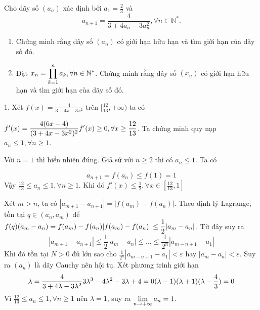 \documentclass[11pt]{scrartcl}
\begin{document}
\begin{itemize}[label=, leftmargin=0em, itemsep=0.5em]
    \begin{bt}
        Cho dãy số $\left(a_n\right)$ xác định bởi $a_1=\frac{2}{3}$ và
        $$
        a_{n+1}=\frac{4}{3+4 a_n-3 a_n^2}, \forall n \in \mathbb{N}^* .
        $$
        \begin{enumerate}
            \item Chứng minh rằng dãy số $\left(a_n\right)$ có giới hạn hữu hạn và tìm giới hạn của dãy số đó.
            \item Đặt $x_n=\displaystyle\prod_{k=1}^n a_k, \forall n \in \mathbb{N}^*$. Chứng minh rằng dây số $\left(x_n\right)$ có giới hạn hữu hạn và tìm giới hạn của dãy số đó.
        \end{enumerate}
    \end{bt}
    \begin{sol}

        1. Xét $f(x) = \frac{4}{3 + 4x - 3x^2}$ trên $[\frac{12}{13}, +\infty)$ ta có 

        $f'(x) = \frac{4(6x - 4)}{(3 + 4x - 3x^2)^2} \ra f'(x) \geq 0 ,\forall x \geq \frac{12}{13}$. Ta chứng minh quy nạp $ a_n \leq 1, \forall n \geq 1$. 
        
        Với $n = 1$ thì hiển nhiên đúng. Giả sử với $n \geq 2$ thì có $ a_n \leq 1$. Ta có 

        \[
        a_{n + 1} = f(a_n) \leq f\left(1\right) = 1
        \]
        Vậy $\frac{12}{13} \leq a_n \leq 1, \forall n \geq 1$. Khi đó $f'(x) \leq \frac{1}{2}, \forall x \in \left[\frac{12}{13},1\right]$

        Xét $m > n$, ta có $|a_{m + 1} - a_{n + 1}| = |f(a_{m}) - f(a_{n})|$. Theo định lý Lagrange, tồn tại $q \in (a_n,a_m)$ để  $f(q)(a_m - a_n) = f(a_m) - f(a_n) \ra |f(a_m) -f(a_n)| \leq \frac{1}{2}|a_m - a_n|$. Từ đây suy ra 
        \[
            |a_{m + 1} - a_{n + 1}| \leq \frac{1}{2}|a_m - a_n| \leq ... \leq \frac{1}{2^n}|a_{m - n + 1} - a_1|
        \]
        Khi đó tồn tại $N > 0$ đủ lớn sao cho $\frac{1}{2^n}|a_{m - n + 1} - a_1| < \varepsilon$ hay $|a_m - a_n | < \varepsilon$. Suy ra $(a_n)$ là dãy Cauchy nên hội tụ. Xét phương trình giới hạn
        \[
            \lambda = \frac{4}{3 + 4\lambda - 3\lambda^2} \lra 3\lambda^3 - 4\lambda^2 -3\lambda + 4 = 0 \lra (\lambda - 1)(\lambda + 1)(\lambda - \frac{4}{3}) = 0
        \]
        Vì $\frac{12}{13} \leq a_n \leq 1, \forall n \geq 1$ nên $\lambda = 1$, suy ra $\displaystyle\lim_{n \to +\infty} a_n = 1$.


\end{sol}
\end{itemize}
\end{document}
